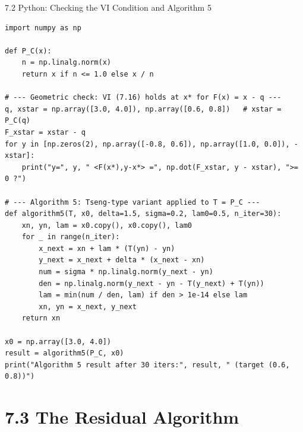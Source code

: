 \documentclass[aspectratio=169,10pt]{beamer}
\begin{document}
\begin{frame}[fragile]{7.2 Python: Checking the VI Condition and Algorithm 5}
\begin{lstlisting}[caption={VI geometry and a projection-free variant (Algorithm 5)}]
import numpy as np

def P_C(x):
    n = np.linalg.norm(x)
    return x if n <= 1.0 else x / n

# --- Geometric check: VI (7.16) holds at x* for F(x) = x - q ---
q, xstar = np.array([3.0, 4.0]), np.array([0.6, 0.8])   # xstar = P_C(q)
F_xstar = xstar - q
for y in [np.zeros(2), np.array([-0.8, 0.6]), np.array([1.0, 0.0]), -xstar]:
    print("y=", y, " <F(x*),y-x*> =", np.dot(F_xstar, y - xstar), ">= 0 ?")

# --- Algorithm 5: Tseng-type variant applied to T = P_C ---
def algorithm5(T, x0, delta=1.5, sigma=0.2, lam0=0.5, n_iter=30):
    xn, yn, lam = x0.copy(), x0.copy(), lam0
    for _ in range(n_iter):
        x_next = xn + lam * (T(yn) - yn)
        y_next = x_next + delta * (x_next - xn)
        num = sigma * np.linalg.norm(y_next - yn)
        den = np.linalg.norm(y_next - yn - T(y_next) + T(yn))
        lam = min(num / den, lam) if den > 1e-14 else lam
        xn, yn = x_next, y_next
    return xn

x0 = np.array([3.0, 4.0])
result = algorithm5(P_C, x0)
print("Algorithm 5 result after 30 iters:", result, " (target (0.6, 0.8))")
\end{lstlisting}
\end{frame}

\section{7.3 The Residual Algorithm}
\end{document}
